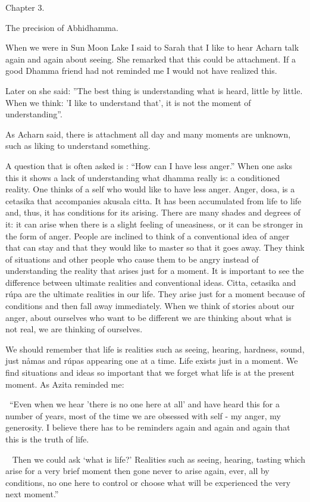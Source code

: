 \documentclass[10pt,a4paper,final]{article}
\begin{document}
Chapter 3. 

The precision of Abhidhamma.

When we were in Sun Moon Lake I said to Sarah that I like to
hear Acharn talk again and again about seeing. She remarked that this
could be attachment. If a good Dhamma friend had not reminded me I would
not have realized this. 

Later on she said: ''The best thing is understanding what is
heard, little by little. When we think: 'I like to understand that', it
is not the moment of understanding''. 

As Acharn said, there is attachment all day and many moments
are unknown, such as liking to understand something. 

A question that is often asked is : ``How can I have less
anger.'' When one asks this it shows a lack of understanding what dhamma
really is: a conditioned reality. One thinks of a self who would like to
have less anger. Anger, dosa, is a cetasika that accompanies akusala
citta. It has been accumulated from life to life and, thus, it has
conditions for its arising. There are many shades and degrees of it: it
can arise when there is a slight feeling of uneasiness, or it can be
stronger in the form of anger. People are inclined to think of a
conventional idea of anger that can stay and that they would like to
master so that it goes away. They think of situations and other people
who cause them to be angry instead of understanding the reality that
arises just for a moment. It is important to see the difference between
ultimate realities and conventional ideas. Citta, cetasika and rúpa are
the ultimate realities in our life. They arise just for a moment because
of conditions and then fall away immediately. When we think of stories
about our anger, about ourselves who want to be different we are
thinking about what is not real, we are thinking of ourselves.

We should remember that life is realities such as seeing,
hearing, hardness, sound, just nåmas and rúpas appearing one at a time.
Life exists just in a moment. We find situations and ideas so important
that we forget what life is at the present moment. As Azita reminded me:


~``Even when we hear
'there is no one here at
all' and have heard this for a number of years,
most of the time we are obsessed with
self - my anger, my generosity. I believe there has to be reminders
again and again and again that this is the truth of life. ~

~ Then we could ask
`what is life?' Realities
such as seeing, hearing, tasting which arise for a very brief moment
then gone never to arise again, ever, all by conditions, no
one here to control or choose what will
be experienced the very next
moment.''~
\end{document}
